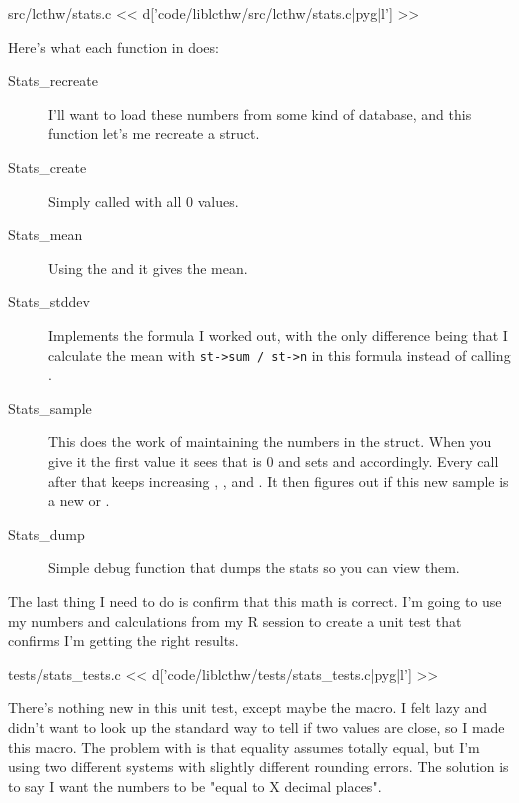 \begin{code}{src/lcthw/stats.c}
<< d['code/liblcthw/src/lcthw/stats.c|pyg|l'] >>
\end{code}

Here's what each function in  does:

\begin{description}
\item[Stats\_recreate] I'll want to load these numbers from some kind of 
    database, and this function let's me recreate a  struct.
\item[Stats\_create] Simply called  with all 0 values.
\item[Stats\_mean] Using the  and  it gives the mean.
\item[Stats\_stddev] Implements the formula I worked out, with the only
    difference being that I calculate the mean with \verb|st->sum / st->n|
    in this formula instead of calling .
\item[Stats\_sample] This does the work of maintaining the numbers in the  struct.  When you give it the first value it sees that  is 0 and
    sets  and  accordingly.  Every call after that keeps
    increasing , , and .  It then figures out
    if this new sample is a new  or .
\item[Stats\_dump] Simple debug function that dumps the stats so you can 
    view them.
\end{description}

The last thing I need to do is confirm that this math is correct.  I'm going
to use my numbers and calculations from my R session to create a unit test
that confirms I'm getting the right results.

\begin{code}{tests/stats\_tests.c}
<< d['code/liblcthw/tests/stats_tests.c|pyg|l'] >>
\end{code}

There's nothing new in this unit test, except maybe the  macro.
I felt lazy and didn't want to look up the standard way to tell if two
 values are close, so I made this macro.  The problem with
 is that equality assumes totally equal, but I'm using two
different systems with slightly different rounding errors.  The solution 
is to say I want the numbers to be "equal to X decimal places".

